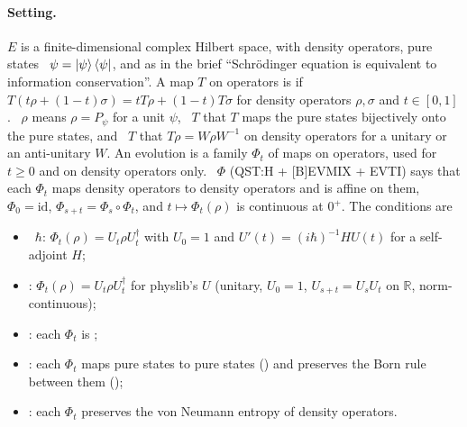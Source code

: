 \documentclass[11pt]{article}
\begin{document}
\paragraph{Setting.} $E$ is a finite-dimensional complex Hilbert space, with density operators,
pure states ~$\psi = \ket{\psi}\bra{\psi}$,  and  as in
the brief ``Schr\"odinger equation is equivalent to information conservation''. A map $T$ on
operators is  if $T(t\rho + (1-t)\sigma) = tT\rho + (1-t)T\sigma$ for
density operators $\rho, \sigma$ and $t \in [0,1]$. ~$\rho$ means $\rho = P_\psi$ for
a unit $\psi$, ~$T$ that $T$ maps the pure states bijectively onto the pure
states, and ~$T$ that $T\rho = W\rho W^{-1}$ on density
operators for a unitary or an anti-unitary $W$. An evolution is a family $\Phi_t$ of maps on
operators, used for $t \ge 0$ and on density operators only. ~$\Phi$
(QST:H + [B]EVMIX + EVTI) says that each $\Phi_t$ maps density operators to density operators and
is affine on them, $\Phi_0 = \mathrm{id}$, $\Phi_{s+t} = \Phi_s \circ \Phi_t$, and
$t \mapsto \Phi_t(\rho)$ is continuous at $0^+$. The conditions are
\begin{itemize}
\item {}~$\hbar$: $\Phi_t(\rho) = U_t\rho U_t^\dagger$ with $U_0 = 1$ and
  $U'(t) = (i\hbar)^{-1}HU(t)$ for a self-adjoint $H$;
\item {}: $\Phi_t(\rho) = U_t\rho U_t^\dagger$ for physlib's
   $U$ (unitary, $U_0 = 1$, $U_{s+t} = U_sU_t$ on $\mathbb{R}$,
  norm-continuous);
\item {}: each $\Phi_t$ is ;
\item {}: each $\Phi_t$ maps pure states to pure states () and
  preserves the Born rule between them ();
\item {}: each $\Phi_t$ preserves the von Neumann entropy of density operators.
\end{itemize}
\end{document}

